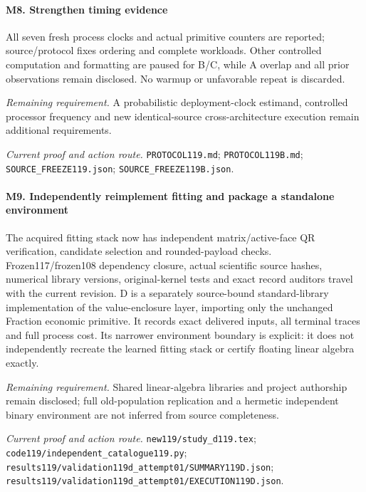 \paragraph{M8. Strengthen timing evidence}

All seven fresh process clocks and actual primitive counters are reported; source/\allowbreak{}protocol fixes ordering and complete workloads. Other controlled computation and formatting are paused for B/\allowbreak{}C, while A overlap and all prior observations remain disclosed. No warmup or unfavorable repeat is discarded.

\par\emph{Remaining requirement.} A probabilistic deployment-clock estimand, controlled processor frequency and new identical-source cross-architecture execution remain additional requirements.

\par\emph{Current proof and action route.} \nolinkurl{PROTOCOL119.md}; \nolinkurl{PROTOCOL119B.md}; \nolinkurl{SOURCE_FREEZE119.json}; \nolinkurl{SOURCE_FREEZE119B.json}.

\paragraph{M9. Independently reimplement fitting and package a standalone environment}

The acquired fitting stack now has independent matrix/\allowbreak{}active-face QR verification, candidate selection and rounded-payload checks. Frozen117/frozen108 dependency closure, actual scientific source hashes, numerical library versions, original-kernel tests and exact record auditors travel with the current revision. D is a separately source-bound standard-library implementation of the value-enclosure layer, importing only the unchanged Fraction economic primitive. It records exact delivered inputs, all terminal traces and full process cost. Its narrower environment boundary is explicit: it does not independently recreate the learned fitting stack or certify floating linear algebra exactly.

\par\emph{Remaining requirement.} Shared linear-algebra libraries and project authorship remain disclosed; full old-population replication and a hermetic independent binary environment are not inferred from source completeness.

\par\emph{Current proof and action route.} \nolinkurl{new119/study_d119.tex}; \nolinkurl{code119/independent_catalogue119.py}; \nolinkurl{results119/validation119d_attempt01/SUMMARY119D.json}; \nolinkurl{results119/validation119d_attempt01/EXECUTION119D.json}.

